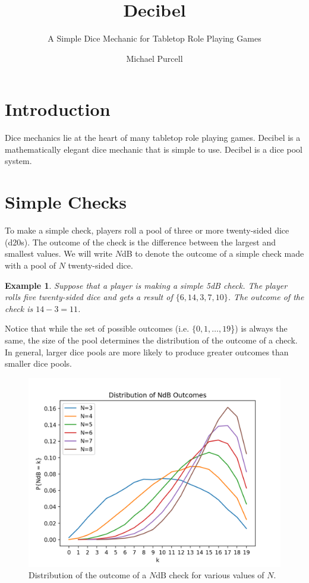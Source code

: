 \documentclass{scrartcl}
\title{Decibel}
\subtitle{A Simple Dice Mechanic for Tabletop Role Playing Games}
\author{Michael Purcell}
\date{}
\newtheorem{example}{Example}
\begin{document}
\maketitle

\section{Introduction}
Dice mechanics lie at the heart of many tabletop role playing games.
Decibel is a mathematically elegant dice mechanic that is simple to use.
Decibel is a dice pool system.

\newpage

\section{Simple Checks}\label{section:simple_checks}
To make a simple check, players roll a pool of three or more twenty-sided dice (d20s).  The outcome of the check is the difference between the largest and smallest values. We will write $N$dB to denote the outcome of a simple check made with a pool of $N$ twenty-sided dice.

\begin{example}
Suppose that a player is making a simple 5dB check.  The player rolls five twenty-sided dice and gets a result of $\{6,14,3,7,10\}$.  The outcome of the check is $14-3 = 11$.
\end{example}

Notice that while the set of possible outcomes (i.e. $\{0,1,\ldots,19$\}) is always the same, the size of the pool determines the distribution of the outcome of a check.  In general, larger dice pools are more likely to produce greater outcomes than smaller dice pools.

\begin{figure}[ht]
\centering
\includegraphics[scale=0.8]{outcome_distributions.png}
\caption{Distribution of the outcome of a $N\text{dB}$ check for various values of $N$.}
\end{figure}
\end{document}

